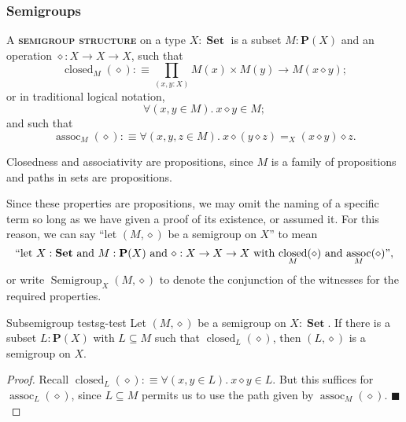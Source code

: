 \documentclass{article}
\newcommand{\defn}[1]{{\scshape\bfseries\color{MPBemph}#1}}
\renewcommand{\qed}{\hfill{\color{MPBthm}\( \blacksquare \)}}
\newcommand{\eql}{\mathbin{:\equiv}}
\newcommand{\tpi}[1]{\prod_{(#1)}}
\newcommand{\1}{\textbf{1}}
\newcommand{\0}{\mathbf{0}}
\newcommand{\2}{\textbf{2}}
\DeclareMathOperator{\Set}{\textbf{Set}}
\renewcommand{\P}{\textbf{P}}
\DeclareMathOperator{\closed}{closed}
\DeclareMathOperator{\assoc}{assoc}
\DeclareMathOperator{\Semigroup}{Semigroup}
\begin{document}
\subsubsection{Semigroups}
A \defn{semigroup structure} on a type \( X : \Set \) is a subset \( M : \P(X) \) and an operation \( \diamond : X \to X \to X \), such that
\[ \closed_{M}(\diamond) \eql \tpi{x, y : X} M(x) \times M(y) \to M(x \diamond y); \]
or in traditional logical notation,
\[ \forall (x, y \in M).~ x \diamond y \in M; \]
and such that
\[ \assoc_{M}(\diamond) \eql \forall(x, y, z \in M).~ x \diamond (y \diamond z) =_{X} (x \diamond y) \diamond z. \]
\begin{lemma}{}{} Closedness and associativity are propositions, since \( M \) is a family of propositions and paths in sets are propositions. \end{lemma}
Since these properties are propositions, we may omit the naming of a specific term so long as we have given a proof of its existence, or assumed it. For this reason, we can say ``let \( (M, \diamond) \) be a semigroup on \( X \)'' to mean
\[ \text{``let \( X : \Set \) and \( M : \P(X) \) and \( \diamond : X \to X \to X \) with \( \closed_{M}(\diamond) \) and \( \assoc_{M}(\diamond) \)''}, \]
or write \( \Semigroup_{X}(M, \diamond) \) to denote the conjunction of the witnesses for the required properties.
\begin{thm}{Subsemigroup test}{sg-test} Let \( (M, \diamond) \) be a semigroup on \( X : \Set \). If there is a subset \( L : \P(X) \) with \( L \subseteq M \) such that \( \closed_{L}(\diamond) \), then \( (L, \diamond) \) is a semigroup on \( X \).
\begin{proof}
	Recall \( \closed_{L}(\diamond) \eql \forall(x, y \in L).~ x \diamond y \in L \). But this suffices for \( \assoc_{L}(\diamond) \), since \( L \subseteq M \) permits us to use the path given by \( \assoc_{M}(\diamond) \). \qed
\end{proof} \end{thm}
\end{document}
